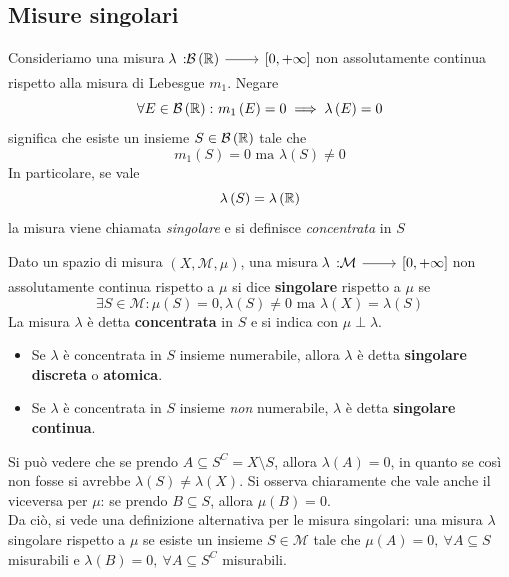\subsection{Misure singolari}
Consideriamo una misura $\funz{\lambda}{\mathcal{B}\left(\realset\right)}{\left[0,+\infty\right]}$ non assolutamente continua rispetto alla misura di Lebesgue $m_1$.
Negare
\begin{equation*}
	\forall E\in\mathcal{B}\left(\mathbb{R}\right)\colon m_1\left(E\right)=0\implies \lambda\left(E\right)=0
\end{equation*}
significa che esiste un insieme $S\in\mathcal{B}\left(\mathbb{R}\right)$ tale che
\begin{equation*}
	m_1\left(S\right)=0\text{ ma }\lambda\left(S\right)\neq 0
\end{equation*}
In particolare, se vale
\begin{equation*}
	\lambda\left(S\right)=\lambda\left(\mathbb{R}\right)
\end{equation*}
la misura viene chiamata \textit{singolare} e si definisce \textit{concentrata} in $S$
\begin{define}
	Dato un spazio di misura $\left(X,\mathcal{M},\mu\right)$, una misura $\funz{\lambda}{\mathcal{M}}{\left[0,+\infty\right]}$ non assolutamente continua rispetto a $\mu$ si dice \textbf{singolare} rispetto a $\mu$ se
	\begin{equation}
		\exists S\in\mathcal{M}\colon \mu\left(S\right)=0, \lambda\left(S\right)\neq0 \text{ ma }\lambda(X)=\lambda\left(S\right)
	\end{equation}
	La misura $\lambda$ è detta \textbf{concentrata} in $S$ e si indica con $\mu\perp\lambda$.
	\begin{itemize}
		\item Se $\lambda$ è concentrata in $S$ insieme numerabile, allora $\lambda$ è detta \textbf{singolare discreta} o \textbf{atomica}.
		\item Se $\lambda$ è concentrata in $S$ insieme \textit{non} numerabile, $\lambda$ è detta \textbf{singolare continua}.
	\end{itemize}
\end{define}
\begin{observe}
	Si può vedere che se prendo $A\subseteq S^{C}=X\setminus S$, allora $\lambda\left(A\right)=0$, in quanto se così non fosse si avrebbe $\lambda\left(S\right)\neq\lambda(X)$. Si osserva chiaramente che vale anche il viceversa per $\mu$: se prendo $B\subseteq S$, allora $\mu\left(B\right)=0$.\\
	Da ciò, si vede una definizione alternativa per le misura singolari: una misura $\lambda$ singolare rispetto a $\mu$ se esiste un insieme $S\in\mathcal{M}$ tale che $\mu\left(A\right)=0,\ \forall A\subseteq S$ misurabili e $\lambda\left(B\right)=0,\ \forall A\subseteq S^{C}$ misurabili.
\end{observe}
